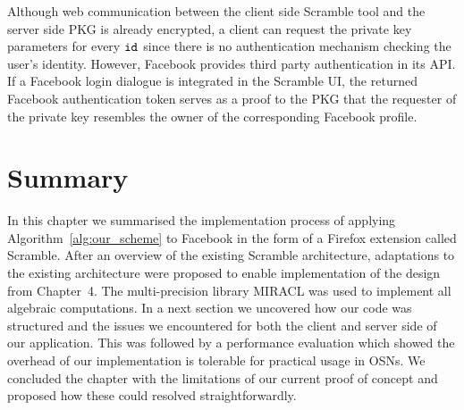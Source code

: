 Although web communication between the client side Scramble tool and the server side PKG is already encrypted, a client can request the private key parameters for every $\mathtt{id}_{}$ since there is no authentication mechanism checking the user's identity. However, Facebook provides third party authentication in its API. If a Facebook login dialogue is integrated in the Scramble UI, the returned Facebook authentication token serves as a proof to the PKG that the requester of the private key resembles the owner of the corresponding Facebook profile.

\section{Summary}
In this chapter we summarised the implementation process of applying Algorithm~\ref{alg:our_scheme} to Facebook in the form of a Firefox extension called Scramble. After an overview of the existing Scramble architecture, adaptations to the existing architecture were proposed to enable implementation of the design from Chapter~4. The multi-precision library MIRACL was used to implement all algebraic computations. In a next section we uncovered how our code was structured and the issues we encountered for both the client and server side of our application. This was followed by a performance evaluation which showed the overhead of our implementation is tolerable for practical usage in OSNs. We concluded the chapter with the limitations of our current proof of concept and proposed how these could resolved straightforwardly.


